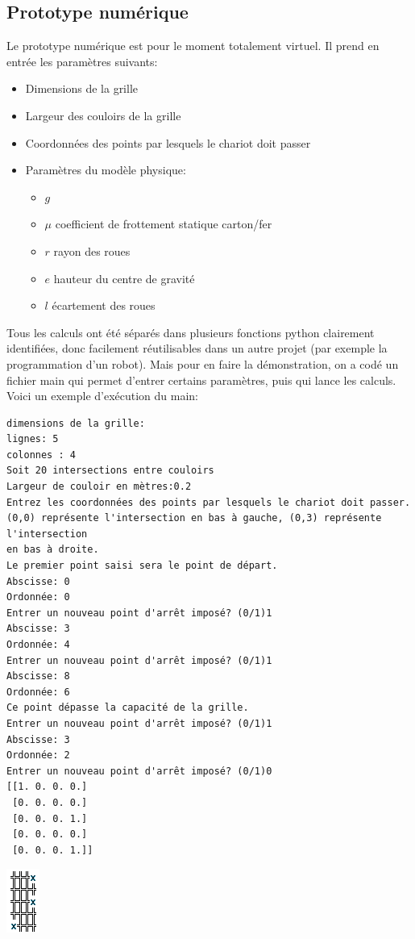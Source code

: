 \subsection{Prototype numérique}
Le prototype numérique est pour le moment totalement virtuel. Il prend en entrée les paramètres suivants:
\begin{itemize}
	\item Dimensions de la grille
	\item Largeur des couloirs de la grille
	\item Coordonnées des points par lesquels le chariot doit passer
	\item Paramètres du modèle physique:
		\begin{itemize}
			\item $g$
			\item $\mu$ coefficient de frottement statique carton/fer
			\item $r$ rayon des roues
			\item $e$ hauteur du centre de gravité
			\item $l$ écartement des roues
		\end{itemize}
\end{itemize}
Tous les calculs ont été séparés dans plusieurs fonctions python clairement identifiées, donc facilement réutilisables dans un autre projet (par exemple la programmation d'un robot). Mais pour en faire la démonstration, on a codé un fichier main qui permet d'entrer certains paramètres, puis qui lance les calculs. Voici un exemple d'exécution du main:
\begin{verbatim}
dimensions de la grille:
lignes: 5
colonnes : 4
Soit 20 intersections entre couloirs
Largeur de couloir en mètres:0.2
Entrez les coordonnées des points par lesquels le chariot doit passer.
(0,0) représente l'intersection en bas à gauche, (0,3) représente l'intersection
en bas à droite.
Le premier point saisi sera le point de départ.
Abscisse: 0
Ordonnée: 0
Entrer un nouveau point d'arrêt imposé? (0/1)1
Abscisse: 3
Ordonnée: 4
Entrer un nouveau point d'arrêt imposé? (0/1)1
Abscisse: 8
Ordonnée: 6
Ce point dépasse la capacité de la grille.
Entrer un nouveau point d'arrêt imposé? (0/1)1
Abscisse: 3
Ordonnée: 2
Entrer un nouveau point d'arrêt imposé? (0/1)0
[[1. 0. 0. 0.]
 [0. 0. 0. 0.]
 [0. 0. 0. 1.]
 [0. 0. 0. 0.]
 [0. 0. 0. 1.]]
\end{verbatim}
\includegraphics{termGrillePoints.png}\\
